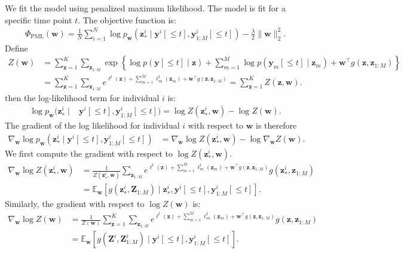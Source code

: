 \documentclass[12pt]{article}
\newcommand{\T}{\top}
\newcommand{\E}{\mathbb{E}}
\newcommand{\given}{\mid}
\begin{document}
We fit the model using penalized maximum likelihood. The model is fit for a specific time point $t$. The objective function is:
\begin{align}
\Phi_{\text{PML}}(\bm{w}) = 
	\frac{1}{N} \sum_{i=1}^N \log p_{\bm{w}}( \bm{z}^i_* \given \bm{y}^i[\le t], \bm{y}^i_{1:M}[\le t] ) - \frac{\lambda}{2} \| \bm{w} \|^2_2.
\end{align}
Define
\begin{align}
Z(\bm{w})
	&= \sum_{\bm{z} = 1}^K \sum_{\bm{z}_{1:M}}
		\exp \left\{ \log p(\bm{y}[\le t] \given \bm{z}) + \sum_{m=1}^M \log p(\bm{y}_m[\le t] \given \bm{z}_m) + \bm{w}^\T g(\bm{z}, \bm{z}_{1:M}) \right\} \\
	&= \sum_{\bm{z} = 1}^K \sum_{\bm{z}_{1:M}}
		e^{\ell^t(\bm{z}) + \sum_{m=1}^M \ell^t_m(\bm{z}_m) + \bm{w}^\T g(\bm{z}, \bm{z}_{1:M})}
	= \sum_{\bm{z} = 1}^K Z(\bm{z}, \bm{w}).
\end{align}
then the log-likelihood term for individual $i$ is:
\begin{align}
\log p_{\bm{w}}( \bm{z}^i_* \given & \bm{y}^i[\le t], \bm{y}^i_{1:M}[\le t] ) = \log Z(\bm{z}^i_*, \bm{w}) - \log Z(\bm{w}).
\end{align}
The gradient of the log likelihood for individual $i$ with respect to $\bm{w}$ is therefore
\begin{align}
\nabla_{\bm{w}} \log p_{\bm{w}}( \bm{z}^i_* \given \bm{y}^i[\le t], \bm{y}^i_{1:M}[\le t] )
	&= \nabla_{\bm{w}} \log Z(\bm{z}^i_*, \bm{w}) - \log \nabla_{\bm{w}} Z(\bm{w}).
\end{align}
We first compute the gradient with respect to $\log Z(\bm{z}^i_*, \bm{w})$.
\begin{align}
\nabla_{\bm{w}} \log Z(\bm{z}^i_*, \bm{w})
	&= \frac{1}{Z(\bm{z}^i_*, \bm{w})}
		 \sum_{\bm{z}_{1:M}}
		 	e^{\ell^t(\bm{z}) + \sum_{m=1}^M \ell^t_m(\bm{z}_m) + \bm{w}^\T g(\bm{z}, \bm{z}_{1:M})} g(\bm{z}^i_*, \bm{z}_{1:M}) \\
	&= \E_{\bm{w}} \left[ g(\bm{z}^i_*, \bm{Z}_{1:M}) \given \bm{z}^i_*, \bm{y}^i[\le t], \bm{y}^i_{1:M}[\le t] \right].
\end{align}
Similarly, the gradient with respect to $\log Z(\bm{w})$ is:
\begin{align}
\nabla_{\bm{w}} \log Z(\bm{w})
	&= \frac{1}{Z(\bm{w})} \sum_{\bm{z} = 1}^K \sum_{\bm{z}_{1:M}}
		e^{\ell^t(\bm{z}) + \sum_{m=1}^M \ell^t_m(\bm{z}_m) + \bm{w}^\T g(\bm{z}, \bm{z}_{1:M})} g(\bm{z}, \bm{z}_{1:M}) \\
	&= \E_{\bm{w}} \left[ g(\bm{Z}^i, \bm{Z}^i_{1:M}) \given \bm{y}^i[\le t], \bm{y}^i_{1:M}[\le t] \right].
\end{align}
\end{document}
